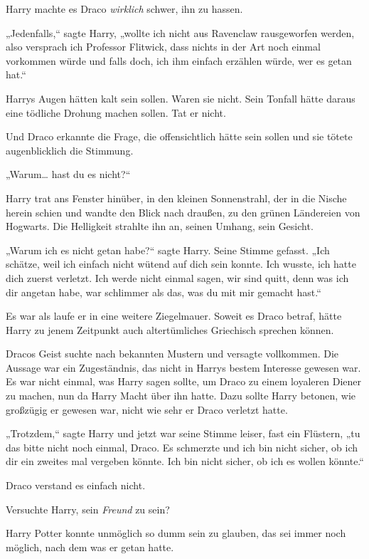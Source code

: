 {Harry machte es Draco \emph{wirklich} schwer, ihn zu hassen.

„Jedenfalls,“ sagte Harry, „wollte ich nicht aus Ravenclaw rausgeworfen werden, also versprach ich Professor Flitwick, dass nichts in der Art noch einmal vorkommen würde und falls doch, ich ihm einfach erzählen würde, wer es getan hat.“

Harrys Augen hätten kalt sein sollen. Waren sie nicht. Sein Tonfall hätte daraus eine tödliche Drohung machen sollen. Tat er nicht.

Und Draco erkannte die Frage, die offensichtlich hätte sein sollen und sie tötete augenblicklich die Stimmung.

„Warum… hast du es nicht?“

Harry trat ans Fenster hinüber, in den kleinen Sonnenstrahl, der in die Nische herein schien und wandte den Blick nach draußen, zu den grünen Ländereien von Hogwarts. Die Helligkeit strahlte ihn an, seinen Umhang, sein Gesicht.

„Warum ich es nicht getan habe?“ sagte Harry. Seine Stimme gefasst. „Ich schätze, weil ich einfach nicht wütend auf dich sein konnte. Ich wusste, ich hatte dich zuerst verletzt. Ich werde nicht einmal sagen, wir sind quitt, denn was ich dir angetan habe, war schlimmer als das, was du mit mir gemacht hast.“

Es war als laufe er in eine weitere Ziegelmauer. Soweit es Draco betraf, hätte Harry zu jenem Zeitpunkt auch altertümliches Griechisch sprechen können.

Dracos Geist suchte nach bekannten Mustern und versagte vollkommen. Die Aussage war ein Zugeständnis, das nicht in Harrys bestem Interesse gewesen war. Es war nicht einmal, was Harry sagen sollte, um Draco zu einem loyaleren Diener zu machen, nun da Harry Macht über ihn hatte. Dazu sollte Harry betonen, wie großzügig er gewesen war, nicht wie sehr er Draco verletzt hatte.

„Trotzdem,“ sagte Harry und jetzt war seine Stimme leiser, fast ein Flüstern, „tu das bitte nicht noch einmal, Draco. Es schmerzte und ich bin nicht sicher, ob ich dir ein zweites mal vergeben könnte. Ich bin nicht sicher, ob ich es wollen könnte.“

Draco verstand es einfach nicht.

Versuchte Harry, sein \emph{Freund} zu sein?

Harry Potter konnte unmöglich so dumm sein zu glauben, das sei immer noch möglich, nach dem was er getan hatte.

}
